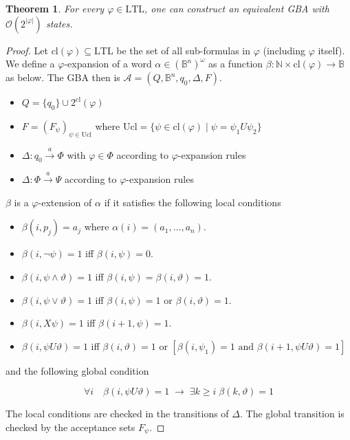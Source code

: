 \documentclass{article}
\newtheorem{theorem}{Theorem}
\begin{document}
\vspace{1cm}
\begin{theorem}
\label{ltl_to_gba}
	For every $\varphi \in \text{LTL}$, one can construct an equivalent GBA with $\mathcal{O}(2^{|\varphi|})$ states.
\end{theorem}
\begin{proof}
	Let $\text{cl}(\varphi) \subseteq \text{LTL}$ be the set of all sub-formulas in $\varphi$ (including $\varphi$ itself). We define a $\varphi$-expansion of a word $\alpha \in (\mathbb{B}^n)^\omega$ as a function $\beta : \mathbb{N} \times \text{cl}(\varphi) \rightarrow \mathbb{B}$ as below. The GBA then is $\mathcal{A} = (Q, \mathbb{B}^n, q_0, \Delta, F)$.
	\begin{itemize}
		\item $Q = \{q_0\} \cup 2^\text{cl}(\varphi)$
		\item $F = (F_\psi)_{\psi \in \text{Ucl}}$ where $\text{Ucl} = \{ \psi \in \text{cl}(\varphi) \mid \psi = \psi_1 U \psi_2 \}$
		\item $\Delta : q_0 \overset{a}{\rightarrow} \Phi$ with $\varphi \in \Phi$ according to $\varphi$-expansion rules
		\item $\Delta : \Phi \overset{a}{\rightarrow} \Psi$ according to $\varphi$-expansion rules
	\end{itemize}
	
	$\beta$ is a $\varphi$-extension of $\alpha$ if it satisfies the following local conditions
	\begin{itemize}
		\item $\beta(i, p_j) = a_j$ where $\alpha(i) = (a_1, \dots, a_n)$.
		\item $\beta(i, \neg \psi) = 1$ iff $\beta(i, \psi) = 0$.
		\item $\beta(i, \psi \land \vartheta) = 1$ iff $\beta(i, \psi) = \beta(i, \vartheta) = 1$.
		\item $\beta(i, \psi \lor \vartheta) = 1$ iff $\beta(i, \psi) = 1$ or $\beta(i, \vartheta) = 1$.
		\item $\beta(i, X \psi) = 1$ iff $\beta(i+1, \psi) = 1$.
		\item $\beta(i, \psi U \vartheta) = 1$ iff $\beta(i, \vartheta) = 1$ or $\left[  \beta(i, \psi_1) = 1 \text{ and } \beta(i+1, \psi U \vartheta) = 1  \right]$
	\end{itemize}
	
	and the following global condition
	
	$$ \forall i \quad \beta(i, \psi U \vartheta) = 1 \;\rightarrow\; \exists k \geq i \; \beta(k, \vartheta) = 1 $$
	
	The local conditions are checked in the transitions of $\Delta$. The global transition is checked by the acceptance sets $F_\psi$.
\end{proof}
\end{document}
